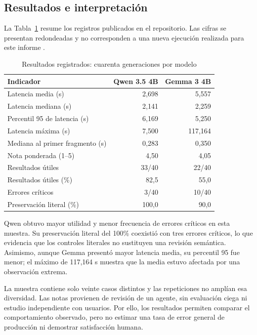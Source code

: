 \documentclass[conference]{IEEEtran}
\begin{document}
\subsection{Resultados e interpretación}
La Tabla~\ref{tab:resultados} resume los registros publicados en el repositorio. Las cifras se presentan redondeadas y no corresponden a una nueva ejecución realizada para este informe \cite{results}.

\begin{table}[htbp]
\caption{Resultados registrados: cuarenta generaciones por modelo}
\label{tab:resultados}
\centering
\small
\setlength{\tabcolsep}{5pt}
\begin{tabular}{lrr}
\toprule
Indicador & Qwen 3.5 4B & Gemma 3 4B \\
\midrule
Latencia media (s) & 2,698 & 5,557 \\
Latencia mediana (s) & 2,141 & 2,259 \\
Percentil 95 de latencia (s) & 6,169 & 5,250 \\
Latencia máxima (s) & 7,500 & 117,164 \\
Mediana al primer fragmento (s) & 0,283 & 0,350 \\
Nota ponderada (1--5) & 4,50 & 4,05 \\
Resultados útiles & 33/40 & 22/40 \\
Resultados útiles (\%) & 82,5 & 55,0 \\
Errores críticos & 3/40 & 10/40 \\
Preservación literal (\%) & 100,0 & 90,0 \\
\bottomrule
\end{tabular}
\end{table}

Qwen obtuvo mayor utilidad y menor frecuencia de errores críticos en esta muestra. Su preservación literal del 100\% coexistió con tres errores críticos, lo que evidencia que los controles literales no sustituyen una revisión semántica. Asimismo, aunque Gemma presentó mayor latencia media, su percentil 95 fue menor; el máximo de 117,164 s muestra que la media estuvo afectada por una observación extrema.

La muestra contiene solo veinte casos distintos y las repeticiones no amplían esa diversidad. Las notas provienen de revisión de un agente, sin evaluación ciega ni estudio independiente con usuarios. Por ello, los resultados permiten comparar el comportamiento observado, pero no estimar una tasa de error general de producción ni demostrar satisfacción humana.
\end{document}
